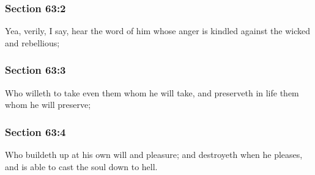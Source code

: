 
	\subsubsection{Section 63:2} %
		\label{DC63-2}

		Yea, verily, I say, hear the word of him whose anger is kindled against the wicked and rebellious;


	\subsubsection{Section 63:3} %
		\label{DC63-3}

		Who willeth to take even them whom he will take, and preserveth in life them whom he will preserve;


	\subsubsection{Section 63:4} %
		\label{DC63-4}

		Who buildeth up at his own will and pleasure; and destroyeth when he pleases, and is able to cast the soul down to hell.

